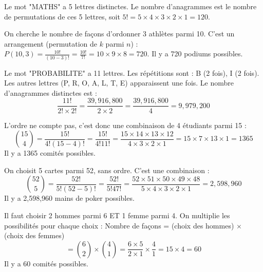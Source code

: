 \begin{correctionbox}
Le mot "MATHS" a 5 lettres distinctes. Le nombre d'anagrammes est le nombre de permutations de ces 5 lettres, soit $5! = 5 \times 4 \times 3 \times 2 \times 1 = 120$.
\end{correctionbox}

\begin{correctionbox}
On cherche le nombre de façons d'ordonner 3 athlètes parmi 10. C'est un arrangement (permutation de $k$ parmi $n$) :
$P(10, 3) = \frac{10!}{(10-3)!} = \frac{10!}{7!} = 10 \times 9 \times 8 = 720$.
Il y a 720 podiums possibles.
\end{correctionbox}

\begin{correctionbox}
Le mot "PROBABILITE" a 11 lettres. Les répétitions sont : B (2 fois), I (2 fois). Les autres lettres (P, R, O, A, L, T, E) apparaissent une fois.
Le nombre d'anagrammes distinctes est :
$$ \frac{11!}{2! \times 2!} = \frac{39,916,800}{2 \times 2} = \frac{39,916,800}{4} = 9,979,200 $$
\end{correctionbox}


\begin{correctionbox}
L'ordre ne compte pas, c'est donc une combinaison de 4 étudiants parmi 15 :
$$ \binom{15}{4} = \frac{15!}{4!(15-4)!} = \frac{15!}{4!11!} = \frac{15 \times 14 \times 13 \times 12}{4 \times 3 \times 2 \times 1} = 15 \times 7 \times 13 \times 1 = 1365 $$
Il y a 1365 comités possibles.
\end{correctionbox}

\begin{correctionbox}
On choisit 5 cartes parmi 52, sans ordre. C'est une combinaison :
$$ \binom{52}{5} = \frac{52!}{5!(52-5)!} = \frac{52!}{5!47!} = \frac{52 \times 51 \times 50 \times 49 \times 48}{5 \times 4 \times 3 \times 2 \times 1} = 2,598,960 $$
Il y a 2,598,960 mains de poker possibles.
\end{correctionbox}

\begin{correctionbox}
Il faut choisir 2 hommes parmi 6 ET 1 femme parmi 4. On multiplie les possibilités pour chaque choix :
Nombre de façons = (choix des hommes) $\times$ (choix des femmes)
$$ = \binom{6}{2} \times \binom{4}{1} = \frac{6 \times 5}{2 \times 1} \times \frac{4}{1} = 15 \times 4 = 60 $$
Il y a 60 comités possibles.
\end{correctionbox}

